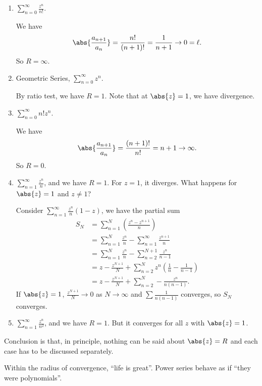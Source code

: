 \begin{example}
    \leavevmode
    \begin{enumerate}
        \item \(\sum\limits_{n=0}^{\infty} \frac{z^n}{n!}\).
        
        We have
        \[
            \abs{\frac{a_{n+1}}{a_n}} = \frac{n!}{(n+1)!} = \frac{1}{n + 1} \to 0 = \ell.
        \]
        So \(R = \infty \).
        \item Geometric Series, \(\sum\limits_{n=0}^{\infty} z^n\).
        
        By ratio test, we have \(R = 1\). Note that at \(\abs{z} = 1\), we have divergence.
        \item \(\sum\limits_{n=0}^{\infty} n!z^n\).

        We have
        \[
            \abs{\frac{a_{n+1}}{a_n}} = \frac{(n+1)!}{n!} = n + 1 \to \infty.
        \]
        So \(R = 0\).
        \item \(\sum\limits_{n=1}^{\infty} \frac{z^n}{n}\), and we have \(R = 1\). For \(z = 1\), it diverges. What happens for \(\abs{z} = 1\) and \(z \neq 1\)?
        
        Consider \(\sum\limits_{n=1}^{\infty} \frac{z^n}{n}(1-z)\), we have the partial sum
        \begin{align*}
            S_N &= \sum\limits_{n=1}^{N} (\frac{z^n - z^{n+1}}{n})\\
            &= \sum\limits_{n=1}^{N} \frac{z^n}{n} - \sum\limits_{n=1}^{\infty} \frac{z^{n+1}}{n}\\
            &= \sum\limits_{n=1}^{N} \frac{z^n}{n} - \sum\limits_{n=2}^{N+1} \frac{z^n}{n - 1}\\
            &= z - \frac{z^{N + 1}}{N} + \sum\limits_{n=2}^{N} z^n (\frac{1}{n} - \frac{1}{n - 1})\\
            &= z - \frac{z^{N + 1}}{N} + \sum\limits_{n=2}^{N} -\frac{z^n}{n(n-1)}.
        \end{align*}
        If \(\abs{z} = 1\), \(\frac{z^{N + 1}}{N} \to 0\) as \(N \to \infty \) and \(\sum \frac{1}{n(n - 1)}\) converges, so \(S_N\) converges.
        \item \(\sum\limits_{n=1}^{\infty} \frac{z^n}{n^2}\), and we have \(R = 1\). But it converges for all \(z\) with \(\abs{z} = 1\).
    \end{enumerate}
\end{example}
Conclusion is that, in principle, nothing can be said about \(\abs{z} = R\) and each case has to be discussed separately.

Within the radius of convergence, ``life is great''. Power series behave as if ``they were polynomials''.
